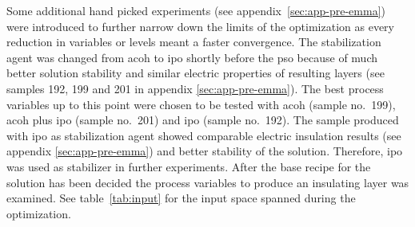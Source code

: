 Some additional hand picked experiments (see appendix~\ref{sec:app-pre-emma}) were introduced to further narrow down the limits of 
the optimization as every reduction in variables or levels meant a faster convergence.
The stabilization agent was changed from \gls{acoh} to \gls{ipo} 
shortly before the \gls{pso}
because of much better solution stability and similar electric properties of resulting layers (see samples 192, 199 and 201 in appendix \ref{sec:app-pre-emma}).
The best process variables up to this point were chosen to be tested with 
 \gls{acoh} (sample no.~199),  \gls{acoh} plus  \gls{ipo} (sample no.~201) and  \gls{ipo} (sample no.~192).
The sample produced with \gls{ipo} as stabilization agent showed comparable electric insulation results (see appendix \ref{sec:app-pre-emma}) and better stability of the solution. 
Therefore, \gls{ipo} was used  as stabilizer in further experiments.
After the base recipe for the solution has been decided
the process variables to produce an insulating layer was examined. 
See table~\ref{tab:input} for the input space spanned during the optimization.

